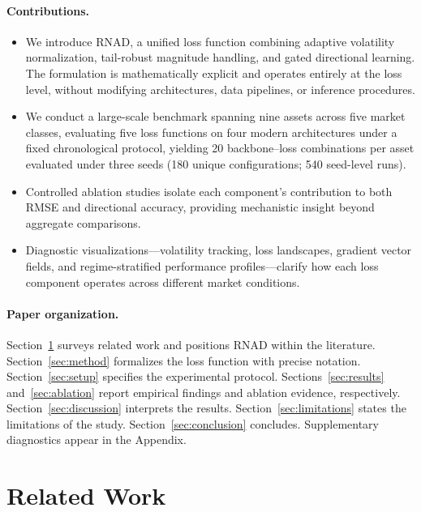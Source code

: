 \documentclass[11pt]{article}
\newcommand{\RNAD}{RNAD\xspace}
\begin{document}
\paragraph{Contributions.}
\begin{itemize}
\item We introduce \RNAD, a unified loss function combining adaptive
  volatility normalization, tail-robust magnitude handling, and gated
  directional learning. The formulation is mathematically explicit and
  operates entirely at the loss level, without modifying architectures,
  data pipelines, or inference procedures.

\item We conduct a large-scale benchmark spanning nine assets across
  five market classes, evaluating five loss functions on four modern
  architectures under a fixed chronological protocol, yielding
  20 backbone--loss combinations per asset evaluated under three
  seeds (180 unique configurations; 540 seed-level runs).

\item Controlled ablation studies isolate each component's contribution
  to both RMSE and directional accuracy, providing mechanistic
  insight beyond aggregate comparisons.

\item Diagnostic visualizations---volatility tracking, loss
  landscapes, gradient vector fields, and regime-stratified
  performance profiles---clarify how each loss component operates
  across different market conditions.
\end{itemize}

\paragraph{Paper organization.}
Section~\ref{sec:related} surveys related work and positions \RNAD
within the literature. Section~\ref{sec:method} formalizes the loss
function with precise notation. Section~\ref{sec:setup} specifies the
experimental protocol. Sections~\ref{sec:results}
and~\ref{sec:ablation} report empirical findings and ablation
evidence, respectively. Section~\ref{sec:discussion} interprets
the results. Section~\ref{sec:limitations} states the limitations
of the study. Section~\ref{sec:conclusion} concludes. Supplementary
diagnostics appear in the Appendix.

\FloatBarrier
\section{Related Work}
\label{sec:related}
\end{document}
